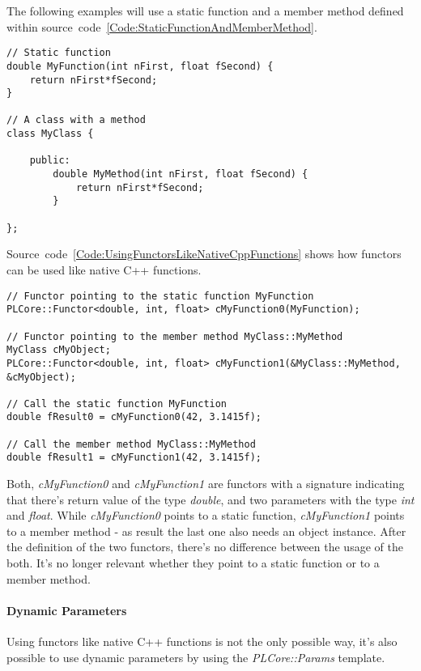 The following examples will use a static function and a member method defined within source~code~\ref{Code:StaticFunctionAndMemberMethod}.
\begin{lstlisting}[float=htb,label=Code:StaticFunctionAndMemberMethod,caption={Static function and member method}]
// Static function
double MyFunction(int nFirst, float fSecond) {
	return nFirst*fSecond;
}

// A class with a method
class MyClass {

	public:
		double MyMethod(int nFirst, float fSecond) {
			return nFirst*fSecond;
		}

};
\end{lstlisting}
Source~code~\ref{Code:UsingFunctorsLikeNativeCppFunctions} shows how functors can be used like native C++ functions.
\begin{lstlisting}[float=htb,label=Code:UsingFunctorsLikeNativeCppFunctions,caption={Using functors like native C++ functions}]
// Functor pointing to the static function MyFunction
PLCore::Functor<double, int, float> cMyFunction0(MyFunction);

// Functor pointing to the member method MyClass::MyMethod
MyClass cMyObject;
PLCore::Functor<double, int, float> cMyFunction1(&MyClass::MyMethod, &cMyObject);

// Call the static function MyFunction
double fResult0 = cMyFunction0(42, 3.1415f);

// Call the member method MyClass::MyMethod
double fResult1 = cMyFunction1(42, 3.1415f);
\end{lstlisting}
Both, \emph{cMyFunction0} and \emph{cMyFunction1} are functors with a signature indicating that there's return value of the type \emph{double}, and two parameters with the type \emph{int} and \emph{float}. While \emph{cMyFunction0} points to a static function, \emph{cMyFunction1} points to a member method - as result the last one also needs an object instance. After the definition of the two functors, there's no difference between the usage of the both. It's no longer relevant whether they point to a static function or to a member method.


\paragraph{Dynamic Parameters}
\label{Functions:DynamicParameters}
Using functors like native C++ functions is not the only possible way, it's also possible to use dynamic parameters by using the \emph{PLCore::Params} template.

